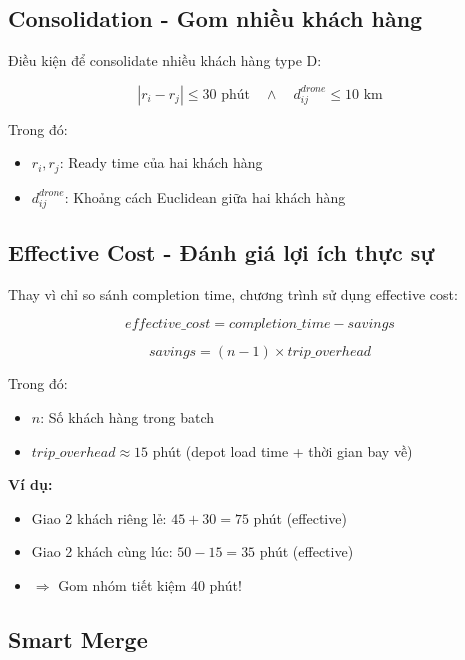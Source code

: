 \documentclass[12pt,a4paper]{article}
\begin{document}
\subsection{Consolidation - Gom nhiều khách hàng}

Điều kiện để consolidate nhiều khách hàng type D:

\begin{equation}
    |r_i - r_j| \leq 30 \text{ phút} \quad \land \quad d_{ij}^{drone} \leq 10 \text{ km}
\end{equation}

Trong đó:
\begin{itemize}
    \item $r_i, r_j$: Ready time của hai khách hàng
    \item $d_{ij}^{drone}$: Khoảng cách Euclidean giữa hai khách hàng
\end{itemize}

\subsection{Effective Cost - Đánh giá lợi ích thực sự}

Thay vì chỉ so sánh completion time, chương trình sử dụng effective cost:

\begin{equation}
    effective\_cost = completion\_time - savings
\end{equation}

\begin{equation}
    savings = (n - 1) \times trip\_overhead
\end{equation}

Trong đó:
\begin{itemize}
    \item $n$: Số khách hàng trong batch
    \item $trip\_overhead \approx 15$ phút (depot load time + thời gian bay về)
\end{itemize}

\textbf{Ví dụ:}
\begin{itemize}
    \item Giao 2 khách riêng lẻ: $45 + 30 = 75$ phút (effective)
    \item Giao 2 khách cùng lúc: $50 - 15 = 35$ phút (effective)
    \item $\Rightarrow$ Gom nhóm tiết kiệm 40 phút!
\end{itemize}

\subsection{Smart Merge}
\end{document}
